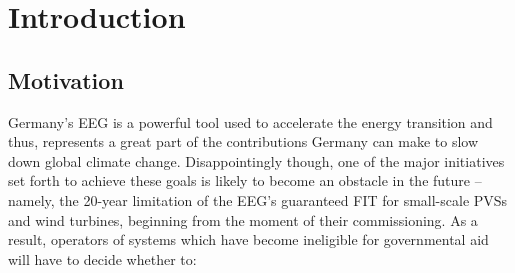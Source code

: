 

\chapter{Introduction}
\label{chp:introduction}

\section{Motivation}
\label{sec:motivation}

Germany's \ac{EEG} is a powerful tool used to accelerate the energy transition and thus, represents a great part of the contributions Germany can make to slow down global climate change. Disappointingly though, one of the major initiatives set forth to achieve these goals is likely to become an obstacle in the future -- namely, the 20-year limitation of the \ac{EEG}'s guaranteed \ac{FIT} for small-scale \acp{PVS} and wind turbines, beginning from the moment of their commissioning. As a result, operators of systems which have become ineligible for governmental aid will have to decide whether to:

